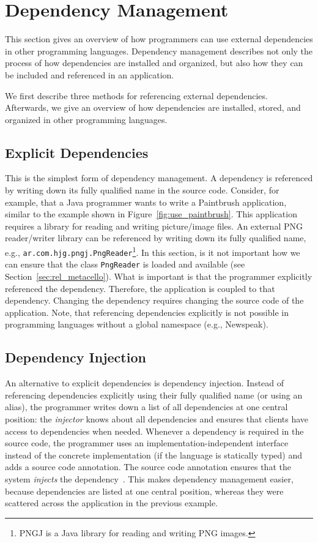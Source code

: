 
\section{Dependency Management}
This section gives an overview of how programmers can use external dependencies in other programming languages. Dependency management describes not only the process of how dependencies are installed and organized, but also how they can be included and referenced in an application.

We first describe three methods for referencing external dependencies. Afterwards, we give an overview of how dependencies are installed, stored, and organized in other programming languages.

\subsection{Explicit Dependencies}
This is the simplest form of dependency management. A dependency is referenced by writing down its fully qualified name in the source code. Consider, for example, that a Java programmer wants to write a Paintbrush application, similar to the example shown in Figure~\ref{fig:use_paintbrush}. This application requires a library for reading and writing picture/image files. An external PNG reader/writer library can be referenced by writing down its fully qualified name, e.g., \texttt{ar.com.hjg.pngj.PngReader}\footnote{PNGJ is a Java library for reading and writing PNG images.}. In this section, is it not important how we can ensure that the class \texttt{PngReader} is loaded and available (see Section~\ref{sec:rel_metacello}). What is important is that the programmer explicitly referenced the dependency. Therefore, the application is coupled to that dependency. Changing the dependency requires changing the source code of the application. Note, that referencing dependencies explicitly is not possible in programming languages without a global namespace (e.g., Newspeak).

\subsection{Dependency Injection}
An alternative to explicit dependencies is dependency injection. Instead of referencing dependencies explicitly using their fully qualified name (or using an alias), the programmer writes down a list of all dependencies at one central position: the \emph{injector} knows about all dependencies and ensures that clients have access to dependencies when needed. Whenever a dependency is required in the source code, the programmer uses an implementation-independent interface instead of the concrete implementation (if the language is statically typed) and adds a source code annotation. The source code annotation ensures that the system \emph{injects} the dependency~\cite{Prasanna:2009:DI:1795686}. This makes dependency management easier, because dependencies are listed at one central position, whereas they were scattered across the application in the previous example.

